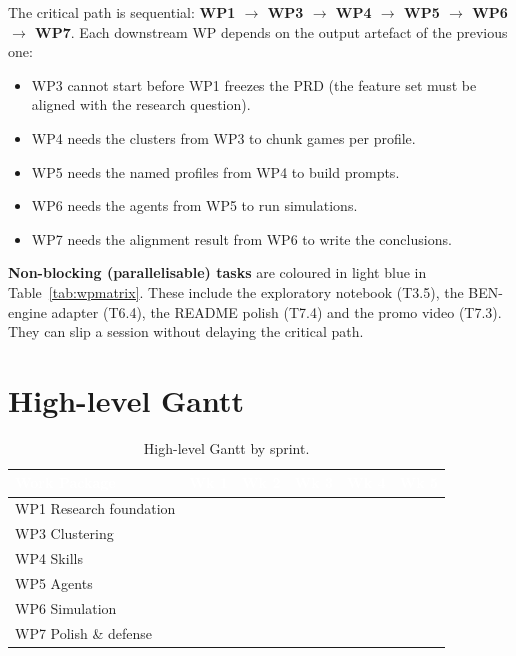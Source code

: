 \documentclass[11pt, a4paper, oneside, openany]{report}
\begin{document}
The critical path is sequential: \textbf{WP1 $\rightarrow$ WP3 $\rightarrow$ WP4 $\rightarrow$ WP5 $\rightarrow$ WP6 $\rightarrow$ WP7}. Each downstream WP depends on the output artefact of the previous one:

\begin{itemize}[leftmargin=*]
    \item WP3 cannot start before WP1 freezes the PRD (the feature set must be aligned with the research question).
    \item WP4 needs the clusters from WP3 to chunk games per profile.
    \item WP5 needs the named profiles from WP4 to build prompts.
    \item WP6 needs the agents from WP5 to run simulations.
    \item WP7 needs the alignment result from WP6 to write the conclusions.
\end{itemize}

\noindent
\textbf{Non-blocking (parallelisable) tasks} are coloured in light blue in Table~\ref{tab:wpmatrix}. These include the exploratory notebook (T3.5), the BEN-engine adapter (T6.4), the README polish (T7.4) and the promo video (T7.3). They can slip a session without delaying the critical path.

\section{High-level Gantt}

\begin{table}[H]
\centering\small
\caption{High-level Gantt by sprint.}
\label{tab:hlgantt}
\renewcommand{\arraystretch}{1.4}
\begin{tabular}{|p{3.5cm}|c|c|c|c|c|}
\hline
\rowcolor{headbg!90}\textcolor{white}{\textbf{Work Package}}
 & \textcolor{white}{\textbf{Wk 1}} & \textcolor{white}{\textbf{Wk 2}} & \textcolor{white}{\textbf{Wk 3}} & \textcolor{white}{\textbf{Wk 4}} & \textcolor{white}{\textbf{Wk 5}} \\
\hline
WP1 Research foundation & \cellcolor{wpcrit}  &                    &                    &                    &                    \\
WP3 Clustering          &                     & \cellcolor{wpcrit} &                    &                    &                    \\
WP4 Skills              &                     & \cellcolor{wpcrit} &                    &                    &                    \\
WP5 Agents              &                     &                    & \cellcolor{wpcrit} &                    &                    \\
WP6 Simulation          &                     &                    &                    & \cellcolor{wpcrit} &                    \\
WP7 Polish \& defense   &                     &                    &                    &                    & \cellcolor{wpcrit} \\
\hline
\end{tabular}
\end{table}
\fi %
\end{document}
